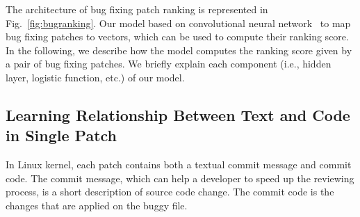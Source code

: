 The architecture of bug fixing patch ranking is represented in Fig.~\ref{fig:bugranking}. Our model based on convolutional neural network~\cite{lecun1995convolutional} to map bug fixing patches to vectors, which can be used to compute their ranking score. In the following, we describe how the model computes the ranking score given by a pair of bug fixing patches. We briefly explain each component (i.e., hidden layer, logistic function, etc.) of our model.

\subsection{Learning Relationship Between Text and Code in Single Patch}
\label{sec:learningTextandCode}
In Linux kernel, each patch contains both a textual commit message and commit code. The commit message, which can help a developer to speed up the reviewing process, is a short description of source code change. The commit code is the changes that are applied on the buggy file. 